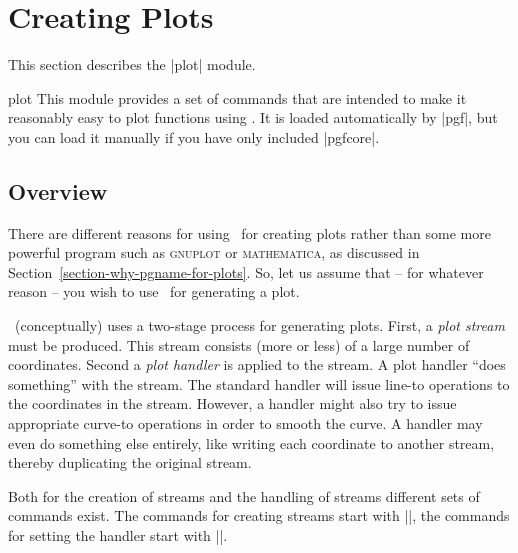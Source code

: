 %
%
%


\section{Creating Plots}

\label{section-plots}

This section describes the |plot| module.

\begin{pgfmodule}{plot}
  This module provides a set of commands that are intended to make it
  reasonably easy to plot functions using \pgfname. It is loaded
  automatically by |pgf|, but you can load it manually if you have
  only included |pgfcore|.
\end{pgfmodule}


\subsection{Overview}

There are different reasons for using \pgfname\ for creating plots
rather than some more powerful program such as \textsc{gnuplot} or
\textsc{mathematica}, as discussed in
Section~\ref{section-why-pgname-for-plots}. So, let us assume that --
for whatever reason -- you wish to use \pgfname\ for generating a plot.

\pgfname\ (conceptually) uses a two-stage process for generating
plots. First, a \emph{plot stream} must be produced. This stream
consists (more or less) of a large number of coordinates. Second a
\emph{plot handler} is applied to the stream. A plot handler ``does
something'' with the stream. The standard handler will issue
line-to operations to the coordinates in the stream. However, a
handler might also try to issue appropriate curve-to operations in
order to smooth the curve. A handler may even do something else
entirely, like writing each coordinate to another stream, thereby
duplicating the original stream.

Both for the creation of streams and the handling of streams different
sets of commands exist. The commands for creating streams start with
|\pgfplotstream|, the commands for setting the handler start with
|\pgfplothandler|.



